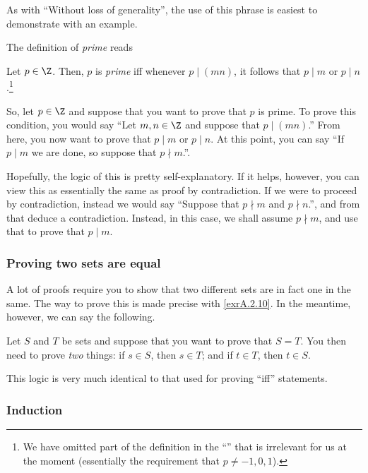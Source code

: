 As with ``Without loss of generality\textellipsis '', the use of this phrase is easiest to demonstrate with an example.

The definition of \emph{prime} reads
\begin{important}
Let $p\in \Z$.  Then, $p$ is \emph{prime} iff \textellipsis whenever $p\mid (mn)$, it follows that $p\mid m$ or $p\mid n$.\footnote{We have omitted part of the definition in the ``\textellipsis'' that is irrelevant for us at the moment (essentially the requirement that $p\neq -1,0,1$).}
\end{important}
So, let $p\in \Z$ and suppose that you want to prove that $p$ is prime.  To prove this condition, you would say ``Let $m,n\in \Z$ and suppose that $p\mid (mn)$.''  From here, you now want to prove that $p\mid m$ or $p\mid n$.  At this point, you can say ``If $p\mid m$ we are done, so suppose that $p\nmid m$.''.

Hopefully, the logic of this is pretty self-explanatory.  If it helps, however, you can view this as essentially the same as proof by contradiction.  If we were to proceed by contradiction, instead we would say ``Suppose that $p\nmid m$ and $p\nmid n$.'', and from that deduce a contradiction.  Instead, in this case, we shall assume $p\nmid m$, and use that to prove that $p\mid m$.

\subsubsection{Proving two sets are equal}

A lot of proofs require you to show that two different sets are in fact one in the same.  The way to prove this is made precise with \cref{exrA.2.10}.  In the meantime, however, we can say the following.
\begin{important}
Let $S$ and $T$ be sets and suppose that you want to prove that $S=T$.  You then need to prove \emph{two} things:  if $s\in S$, then $s\in T$; and if $t\in T$, then $t\in S$.
\end{important}
This logic is very much identical to that used for proving ``iff'' statements.

\subsubsection{Induction}

